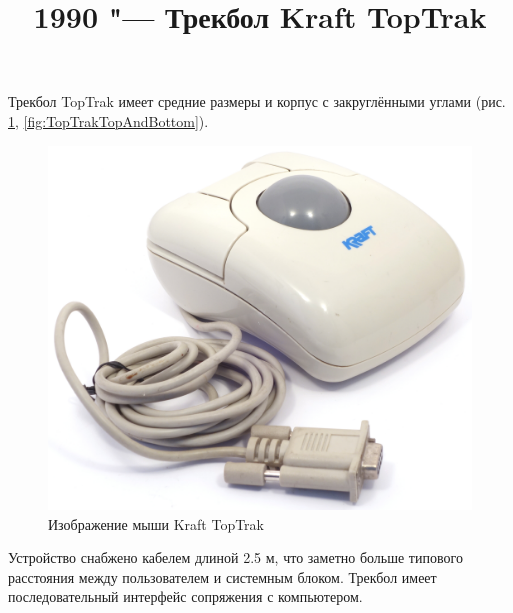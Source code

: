 \documentclass[11pt, a4paper]{article}
\begin{document}
\title{1990 "--- Трекбол Kraft TopTrak}
\date{}
\maketitle
{}
Трекбол TopTrak имеет средние размеры и корпус с закруглёнными углами (рис. \ref{fig:TopTrakPic}, \ref{fig:TopTrakTopAndBottom}).

\begin{figure}[h]
    \centering
    \includegraphics[scale=0.45]{1990_kraft_toptrack/pic_60.jpg}
    \caption{Изображение мыши Kraft TopTrak}
    \label{fig:TopTrakPic}
\end{figure}

Устройство снабжено кабелем длиной 2.5 м, что заметно больше типового расстояния между пользователем и системным блоком. Трекбол имеет последовательный интерфейс сопряжения с компьютером.
\end{document}

